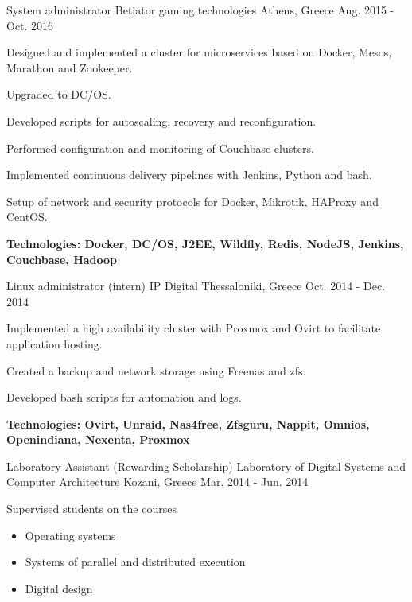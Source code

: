 \begin{cventries}
\cventry
{System administrator} %
{Betiator gaming technologies} %
{Athens, Greece} %
{Aug. 2015 - Oct. 2016} %
{ %
\begin{cvitems}
\item {Designed and implemented a cluster for microservices based on Docker, Mesos, Marathon and Zookeeper.}
\item {Upgraded to DC/OS.}
\item {Developed scripts for autoscaling, recovery and reconfiguration.}
\item {Performed configuration and monitoring of Couchbase clusters.}
\item {Implemented continuous delivery pipelines with Jenkins, Python and bash.}
\item {Setup of network and security protocols for Docker, Mikrotik, HAProxy and CentOS.}
\item {\bfseries{Technologies:} Docker, DC/OS, J2EE, Wildfly, Redis, NodeJS, Jenkins, Couchbase, Hadoop}
\end{cvitems}
}


\cventry
{Linux administrator (intern)} %
{IP Digital} %
{Thessaloniki, Greece} %
{Oct. 2014 - Dec. 2014} %
{ %
\begin{cvitems}
\item {Implemented a high availability cluster with Proxmox and Ovirt to facilitate application hosting.}
\item {Created a backup and network storage using Freenas and zfs.}
\item {Developed bash scripts for automation and logs.}
\item {\bfseries{Technologies:} Ovirt, Unraid, Nas4free, Zfsguru, Nappit, Omnios, Openindiana, Nexenta, Proxmox}
\end{cvitems}
}


\cventry
{Laboratory Assistant (Rewarding Scholarship)} %
{Laboratory of Digital Systems and Computer Architecture} %
{Kozani, Greece} %
{Mar. 2014 - Jun. 2014} %
{ %
\begin{cvitems}
\item {Supervised students on the courses}
\begin{itemize}
\item {Operating systems}
\item {Systems of parallel and distributed execution}
\item {Digital design}
\end{itemize}
\end{cvitems}
}


\end{cventries}
